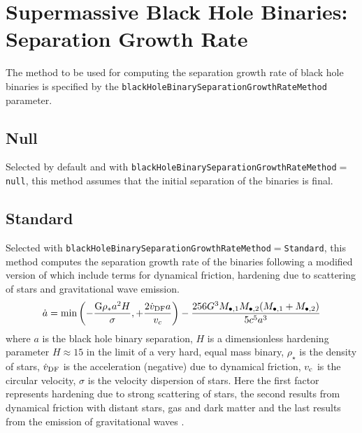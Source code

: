 \section{Supermassive Black Hole Binaries: Separation Growth Rate}

The method to be used for computing the separation growth rate of black hole binaries is specified by the {\tt blackHoleBinarySeparationGrowthRateMethod} parameter.

\subsection{Null}

Selected by default and with {\tt blackHoleBinarySeparationGrowthRateMethod}$=${\tt null}, this method assumes that the initial separation of the binaries is final.

\subsection{Standard}

Selected with {\tt blackHoleBinarySeparationGrowthRateMethod}$=${\tt Standard}, this method computes the separation growth rate of the binaries following a modified version of \cite {volonteri_assembly_2003} which include terms for dynamical friction, hardening due to scattering of stars and gravitational wave emission.
\begin{equation}
\dot{a} = \hbox{min} \left( - \frac{{\rm G}\rho _{*}a^2 H}{\sigma}, +\frac{2 \dot{v}_{\rm DF} a}{v_c} \right) - \frac{256 G^3 M_{\bullet, 1} M_{\bullet, 2} (M_{\bullet, 1} +M_{\bullet, 2})}{5 c^5 a^3}
\end{equation}
where $a$ is the black hole binary
separation, $H$ is a dimensionless hardening parameter $H\approx 15$ in the limit of 
a very hard, equal mass binary, $\rho _\star$ is the density of stars,
$\dot{v}_{\rm DF}$ is the acceleration (negative) due to dynamical friction,
$v_{\rm c}$ is the circular velocity, $\sigma$ is the velocity dispersion of stars. Here the first factor represents hardening due to strong scattering of stars, the second results from dynamical friction with distant stars, gas and dark matter and the last results from the emission of gravitational waves \cite{peters_gravitational_1964}.

